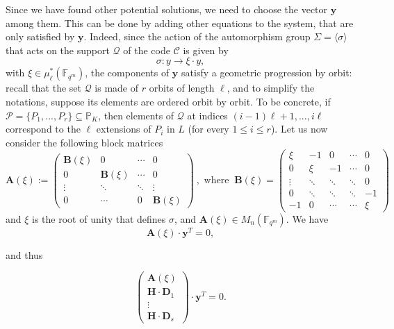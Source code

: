 \documentclass[10pt]{article}
\theoremstyle{definition}
\theoremstyle{definition}
\theoremstyle{definition}
\newcommand{\cd}{\cdot}
\newcommand{\PP}{\mathbb{P}}
\newcommand{\fqm}{\mathbb{F}_{q^m}}
\newcommand{\su}{\subseteq}
\newcommand{\PR}{\mathcal{P}}
\newcommand{\QR}{\mathcal{Q}}
\begin{document}
Since we have found other potential solutions, we need to choose the vector $\mathbf{y}$ among them. This can be done by adding other equations to the system, that are only satisfied by $\mathbf{y}$. Indeed, since the action of the automorphism group $\Sigma = \langle\sigma\rangle$ that acts on the support $\QR$ of the code $\mathcal{C}$ is given by 
\[\sigma : y \longrightarrow \xi \cd y,\]
with $\xi \in \mu^*_{\ell}(\fqm)$, the components of $\mathbf{y}$ satisfy a geometric progression by orbit: recall that the set $\QR$ is made of $r$ orbits of length $\ell$, and to simplify the notations, suppose its elements are ordered orbit by orbit. To be concrete, if $\PR = \{P_1,...,P_r\} \su \PP_K$, then elements of $\QR$ at indices $(i-1)\ell+1,...,i\ell$ correspond to the $\ell$ extensions of $P_{i}$ in $L$ (for every $1\leq i \leq r$). Let us now consider the following block matrices
\begin{equation*} 
\mathbf{A}(\xi) := 
\begin{pmatrix}
\mathbf{B}(\xi) & 0 & \cdots & 0 \\
0 & \mathbf{B}(\xi) & \cdots & 0 \\
\vdots & \ddots & \ddots & \vdots \\
0 & \cdots & 0 & \mathbf{B}(\xi)
\end{pmatrix} \ , \textrm{ where }\ 
\mathbf{B}(\xi) = 
\begin{pmatrix}
\xi & -1 & 0 & \cdots & 0 \\
0 & \xi & -1 & \cdots & 0 \\
\vdots & \ddots & \ddots & \ddots & 0 \\
0 & \ddots & \ddots & \ddots & -1 \\
-1 & 0 & \cdots & \cdots & \xi
\end{pmatrix}
\end{equation*}
and $\xi$ is the root of unity that defines $\sigma$, and $\mathbf{A}(\xi) \in M_{n}(\fqm)$. We have
\begin{equation*}
\mathbf{A}(\xi) \cd \textbf{y}^T
= 0,
\end{equation*}

and thus

\begin{equation} \label{system kummer}
\begin{pmatrix}
\mathbf{A}(\xi) \\
\mathbf{H} \cd \mathbf{D}_1 \\
\vdots \\
\mathbf{H} \cd \mathbf{D}_s
\end{pmatrix}
\cd \mathbf{y}^T = 0.
\end{equation}
\end{document}
